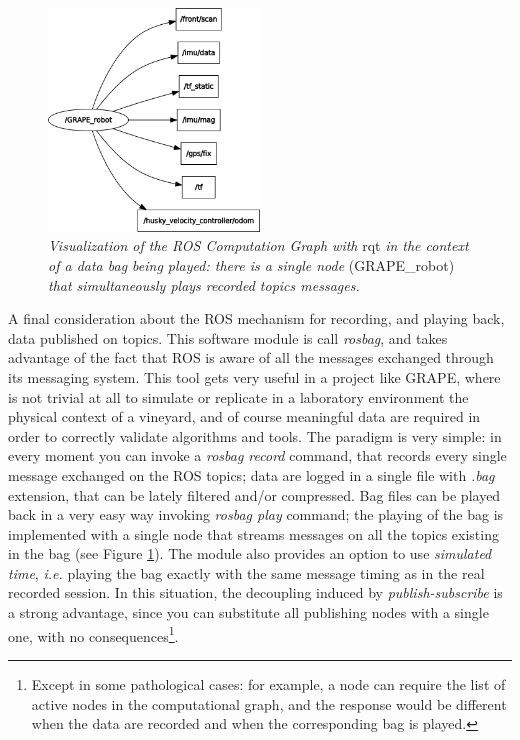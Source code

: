 \begin{figure}
	\centering
	\includegraphics[width=0.5\textwidth]{Images/background_and_tools/bagPlay.png}
	\caption{\textit{Visualization of the \ac{ROS} Computation Graph with} rqt\textit{ in the context of a data bag being played: there is a single node} (GRAPE\_robot) \textit{that simultaneously plays recorded topics messages.}}
	\label{fig:playBag}
\end{figure}

A final consideration about the \ac{ROS} mechanism for recording, and playing back, data published on topics. This software module is call \textit{rosbag}, and takes advantage of the fact that \ac{ROS} is aware of all the messages exchanged through its messaging system. This tool gets very useful in a project like \ac{GRAPE}, where is not trivial at all to simulate or replicate in a laboratory environment the physical context of a vineyard, and of course meaningful data are required in order to correctly validate algorithms and tools.
The paradigm is very simple: in every moment you can invoke a \textit{rosbag record} command, that records every single message exchanged on the \ac{ROS} topics; data are logged in a single file with \textit{.bag} extension, that can be lately filtered and/or compressed. Bag files can be played back in a very easy way invoking \textit{rosbag play} command; the playing of the bag is implemented with a single node that streams messages on all the topics existing in the bag (see Figure \ref{fig:playBag}). The module also provides an option to use \textit{simulated time}, \textit{i.e.} playing the bag exactly with the same message timing as in the real recorded session. In this situation, the decoupling induced by \textit{publish-subscribe} is a strong advantage, since you can substitute all publishing nodes with a single one, with no consequences\footnote{Except in some pathological cases: for example, a node can require the list of  active nodes in the computational graph, and the response would be different when the data are recorded and when the corresponding bag is played.}.


